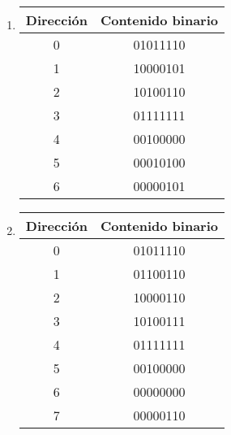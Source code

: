\documentclass[12pt]{article}
\begin{document}
\begin{enumerate}
\begin{enumerate}
            \item \begin{tabular}{| c | c |}
                    \hline
                    \textbf{Dirección}&\textbf{Contenido binario}\\
                    \hline \hline
                    0 & 01011110\\ \hline
                    1 & 10000101\\ \hline
                    2 & 10100110\\ \hline
                    3 & 01111111\\ \hline
                    4 & 00100000\\ \hline
                    5 & 00010100\\ \hline
                    6 & 00000101\\ \hline
            \end{tabular}

            \item \begin{tabular}{| c | c |}
                    \hline
                    \textbf{Dirección}&\textbf{Contenido binario}\\
                    \hline \hline
                    0 & 01011110\\ \hline
                    1 & 01100110\\ \hline
                    2 & 10000110\\ \hline
                    3 & 10100111\\ \hline
                    4 & 01111111\\ \hline
                    5 & 00100000\\ \hline
                    6 & 00000000\\ \hline
                    7 & 00000110\\ \hline
            \end{tabular}


\end{enumerate}
\end{enumerate}
\end{document}
